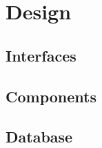 \chapter{Design}\label{part:design}






 
\section{Interfaces}
 
\section{Components}
 
\section{Database}
 

